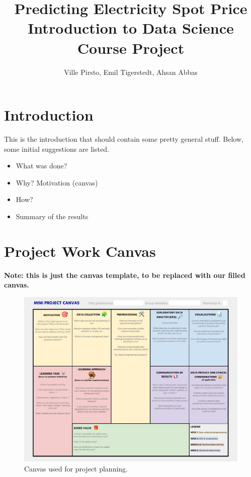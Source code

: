 \documentclass{article}
\title{%
	Predicting Electricity Spot Price\\
	\large Introduction to Data Science Course Project}
\author{Ville Pirsto, Emil Tigerstedt, Ahsan Abbas}
\numberwithin{equation}{section}
\begin{document}
\begin{titlepage}
	\maketitle
	\thispagestyle{empty}
\end{titlepage}

\tableofcontents
\clearpage

\section{Introduction}
This is the introduction that should contain some pretty general stuff. Below, some initial suggestions are listed.
\begin{itemize}
	\item What was done?
	\item Why? Motivation (canvas)
	\item How? 
	\item Summary of the results
\end{itemize}

\section{Project Work Canvas}
\textbf{Note: this is just the canvas template, to be replaced with our filled canvas.}
\begin{figure}[htb]
	\centering
	\includegraphics[width=1\textwidth]{./mini_project_canvas.pdf}
	\caption{Canvas used for project planning.}
	\label{fig1}
\end{figure}
\end{document}
